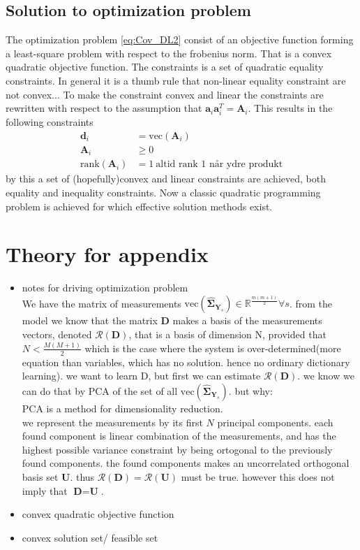\subsection{Solution to optimization problem}
The optimization problem \eqref{eq:Cov_DL2} consist of an objective function forming a least-square problem with respect to the frobenius norm.
That is a convex quadratic objective function.
The constraints is a set of quadratic equality constraints. In general it is a thumb rule that non-linear equality constraint are not convex...
To make the constraint convex and linear the constraints are rewritten with respect to the assumption that $\textbf{a}_i\textbf{a}_i^{T} = \textbf{A}_i$. This results in the following constraints 
\begin{align}
\textbf{d}_i &= \text{vec}(\textbf{A}_i) \\
\textbf{A}_i &\geq  0 \\
\text{rank}(\textbf{A}_i) &= 1 \ \text{altid rank 1 når ydre produkt}
\end{align}          
by this a set of (hopefully)convex and linear constraints are achieved, both equality and inequality constraints.
Now a classic quadratic programming problem is achieved      for which effective solution methods exist.   

\section{Theory for appendix}
\begin{itemize}
\item notes for driving optimization problem\\
We have the matrix of measurements $\text{vec}(\widehat{\boldsymbol{\Sigma}}_{\textbf{Y}_s})\in \mathbb{R}^{\frac{m(m+1)}{2}} \forall s$. from the model we know that the matrix $\textbf{D}$ makes a basis of the measurements vectors, denoted $\mathcal{R}(\textbf{D})$, that is a basis of dimension N, provided that $N < \frac{M(M+1)}{2}$ which is the case where the system is over-determined(more equation than variables, which has no solution. hence no ordinary dictionary learning). 
we want to learn D, but first we can estimate $\mathcal{R}(\textbf{D})$. 
we know we can do that by PCA of the set of all $\text{vec}(\widehat{\boldsymbol{\Sigma}}_{\textbf{Y}_s})$. but why:\\
PCA is a method for dimensionality reduction. \\
we represent the measurements by its first $N$ principal components. 
each found component is linear combination of the measurements, and has the highest possible variance constraint by being ortogonal to the previously found components. the found components makes an uncorrelated orthogonal basis set $\textbf{U}$. 
thus  $\mathcal{R}(\textbf{D}) = \mathcal{R}(\textbf{U})$ must be true. however this does not imply that $\textbf{D}=\textbf{U}$.  

      



\item convex quadratic objective function
\item convex solution set/ feasible set 

\end{itemize}
